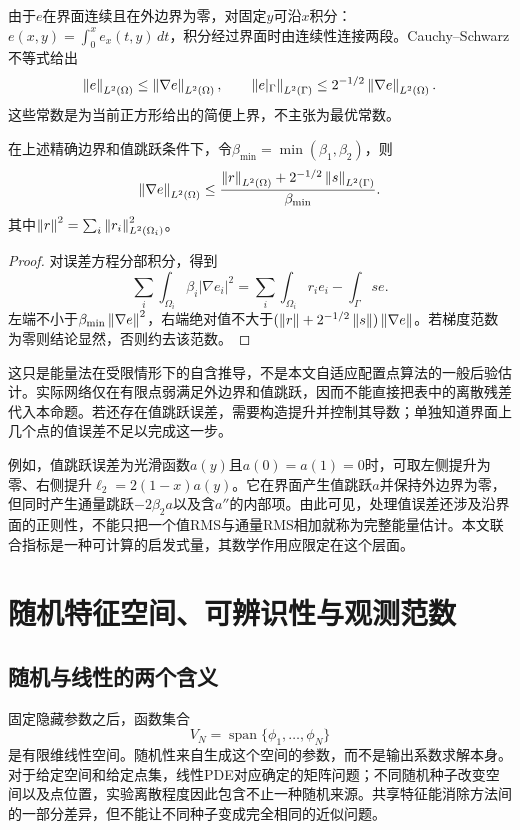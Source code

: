 由于$e$在界面连续且在外边界为零，对固定$y$可沿$x$积分：$e(x,y)=\int_0^x e_x(t,y)\,dt$，积分经过界面时由连续性连接两段。Cauchy--Schwarz不等式给出
\[
\left\lVert e\right\rVert_{L^2(\Omega)}\le\left\lVert\nabla e\right\rVert_{L^2(\Omega)},\qquad
\left\lVert e|_\Gamma\right\rVert_{L^2(\Gamma)}\le 2^{-1/2}\left\lVert\nabla e\right\rVert_{L^2(\Omega)}.
\]
这些常数是为当前正方形给出的简便上界，不主张为最优常数。
\begin{proposition}[特定假设下的连续残差控制]\label{prop:energy}
在上述精确边界和值跳跃条件下，令$\beta_{\min}=\min(\beta_1,\beta_2)$，则
\begin{equation}
\left\lVert\nabla e\right\rVert_{L^2(\Omega)}
\le\frac{\left\lVert r\right\rVert_{L^2(\Omega)}+2^{-1/2}\left\lVert s\right\rVert_{L^2(\Gamma)}}{\beta_{\min}}.
\end{equation}
其中$\left\lVert r\right\rVert^2=\sum_i\left\lVert r_i\right\rVert_{L^2(\Omega_i)}^2$。
\end{proposition}
\begin{proof}
对误差方程分部积分，得到
\[
\sum_i\int_{\Omega_i}\beta_i|\nabla e_i|^2
=\sum_i\int_{\Omega_i}r_ie_i-\int_\Gamma se.
\]
左端不小于$\beta_{\min}\left\lVert\nabla e\right\rVert^2$，右端绝对值不大于$(\left\lVert r\right\rVert+2^{-1/2}\left\lVert s\right\rVert)\left\lVert\nabla e\right\rVert$。若梯度范数为零则结论显然，否则约去该范数。
\end{proof}
这只是能量法在受限情形下的自含推导，不是本文自适应配置点算法的一般后验估计。实际网络仅在有限点弱满足外边界和值跳跃，因而不能直接把表中的离散残差代入本命题。若还存在值跳跃误差，需要构造提升并控制其导数；单独知道界面上几个点的值误差不足以完成这一步。

例如，值跳跃误差为光滑函数$a(y)$且$a(0)=a(1)=0$时，可取左侧提升为零、右侧提升$\ell_2=2(1-x)a(y)$。它在界面产生值跳跃$a$并保持外边界为零，但同时产生通量跳跃$-2\beta_2a$以及含$a''$的内部项。由此可见，处理值误差还涉及沿界面的正则性，不能只把一个值RMS与通量RMS相加就称为完整能量估计。本文联合指标是一种可计算的启发式量，其数学作用应限定在这个层面。

\section{随机特征空间、可辨识性与观测范数}
\subsection{随机与线性的两个含义}
固定隐藏参数之后，函数集合
\[
V_N=\operatorname{span}\{\phi_1,\ldots,\phi_N\}
\]
是有限维线性空间。随机性来自生成这个空间的参数，而不是输出系数求解本身。对于给定空间和给定点集，线性PDE对应确定的矩阵问题；不同随机种子改变空间以及点位置，实验离散程度因此包含不止一种随机来源。共享特征能消除方法间的一部分差异，但不能让不同种子变成完全相同的近似问题。

